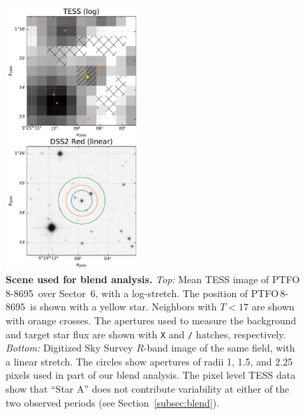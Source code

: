 \documentclass[12pt,twocolumn,tighten]{aastex62}
\newcommand{\ptfo}{PTFO$\,$8-8695}
\begin{document}
\begin{figure}[t]
	\begin{center}
		\leavevmode
		\includegraphics[width=0.45\textwidth]{f4.pdf}
	\end{center}
	\vspace{-0.7cm}
	\caption{ {\bf Scene used for blend analysis.}
		{\it Top:} Mean TESS image of \ptfo\ over Sector~6, with a
		log-stretch.  The position of \ptfo\ is shown with a yellow
		star.  Neighbors with $T<17$ are shown with orange crosses.  The
		apertures used to measure the background and target star flux are
		shown with \texttt{X} and \texttt{/} hatches, respectively.
		{\it Bottom:} Digitized Sky Survey $R$-band image of the same
		field, with a linear stretch. The circles show apertures of radii
		1, 1.5, and 2.25 pixels used in part of our blend analysis.  The
		pixel level TESS data show that ``Star A''  does not contribute
		variability at either of the two observed periods (see
		Section~\ref{subsec:blend}).
		\label{fig:scene}
	}
\end{figure}
\end{document}

